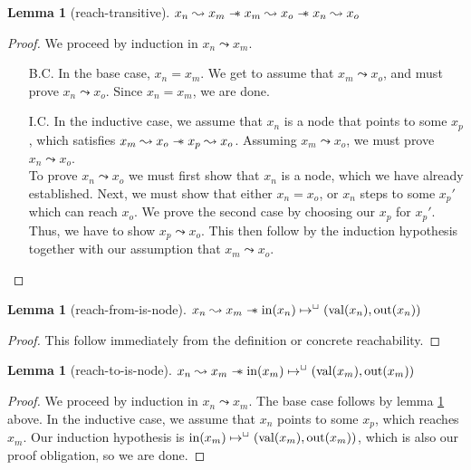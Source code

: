 \documentclass[a4paper, 10pt]{report}
\theoremstyle{definition}
\newtheorem{lemma}[theorem]{Lemma}
\newcommand{\nIn}[1]{\operatorname{in}(#1)}
\newcommand{\nVal}[1]{\operatorname{val}(#1)}
\newcommand{\nOut}[1]{\operatorname{out}(#1)}
\newcommand{\node}{x}
\newcommand{\nodeM}[1]{\node_{#1}}
\newcommand{\isNode}[1]{\nIn{#1} \mapsto^{\persistently} (\nVal{#1}, \nOut{#1})}
\newcommand{\reach}[2]{#1 \leadsto #2}
\begin{document}
\begin{lemma}[reach-transitive]\label{lemma:reach-transitive}
  $\reach{\nodeM{n}}{\nodeM{m}} \wand \reach{\nodeM{m}}{\nodeM{o}} \wand \reach{\nodeM{n}}{\nodeM{o}}$
\end{lemma}
\begin{proof}
  We proceed by induction in $\reach{\nodeM{n}}{\nodeM{m}}$.
  \begin{itemize}
    \item[B.C.] In the base case, $\nodeM{n} = \nodeM{m}$. We get to assume that $\reach{\nodeM{m}}{\nodeM{o}}$, and must prove $\reach{\nodeM{n}}{\nodeM{o}}$. Since $\nodeM{n} = \nodeM{m}$, we are done.
    \item[I.C.] In the inductive case, we assume that $\nodeM{n}$ is a node that points to some $\nodeM{p}$, which satisfies $\reach{\nodeM{m}}{\nodeM{o}} \wand \reach{\nodeM{p}}{\nodeM{o}}$. Assuming $\reach{\nodeM{m}}{\nodeM{o}}$, we must prove $\reach{\nodeM{n}}{\nodeM{o}}$.\\
    To prove $\reach{\nodeM{n}}{\nodeM{o}}$ we must first show that $\nodeM{n}$ is a node, which we have already established. Next, we must show that either $\nodeM{n} = \nodeM{o}$, or $\nodeM{n}$ steps to some $\nodeM{p}'$ which can reach $\nodeM{o}$. We prove the second case by choosing our $\nodeM{p}$ for $\nodeM{p}'$. Thus, we have to show $\reach{\nodeM{p}}{\nodeM{o}}$. This then follow by the induction hypothesis together with our assumption that $\reach{\nodeM{m}}{\nodeM{o}}$.
  \end{itemize}
\end{proof}

\begin{lemma}[reach-from-is-node]\label{lemma:reach-from-is-node}
  $\reach{\nodeM{n}}{\nodeM{m}} \wand \isNode{\nodeM{n}}$
\end{lemma}
\begin{proof}
  This follow immediately from the definition or concrete reachability.
\end{proof}

\begin{lemma}[reach-to-is-node]\label{lemma:reach-to-is-node}
  $\reach{\nodeM{n}}{\nodeM{m}} \wand \isNode{\nodeM{m}}$
\end{lemma}
\begin{proof}
  We proceed by induction in $\reach{\nodeM{n}}{\nodeM{m}}$. The base case follows by lemma \ref{lemma:reach-from-is-node} above. In the inductive case, we assume that $\nodeM{n}$ points to some $\nodeM{p}$, which reaches $\nodeM{m}$. Our induction hypothesis is $\isNode{\nodeM{m}}$, which is also our proof obligation, so we are done.
\end{proof}
\end{document}
